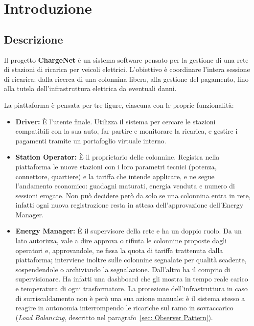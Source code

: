 \chapter{Introduzione}


\section{Descrizione}
Il progetto \textbf{ChargeNet} è un sistema software pensato per la gestione di una rete di stazioni di ricarica per veicoli elettrici. L'obiettivo è coordinare l'intera sessione di ricarica: dalla ricerca di una colonnina libera, alla gestione del pagamento, fino alla tutela dell'infrastruttura elettrica da eventuali danni.

La piattaforma è pensata per tre figure, ciascuna con le proprie funzionalità:

\begin{itemize}
    \item \textbf{Driver:} È l'utente finale. Utilizza il sistema per cercare le stazioni compatibili con la sua auto, far partire e monitorare la ricarica, e gestire i pagamenti tramite un portafoglio virtuale interno.
    
    \item \textbf{Station Operator:} È il proprietario delle colonnine. Registra nella piattaforma le nuove stazioni con i loro parametri tecnici (potenza, connettore, quartiere) e la tariffa che intende applicare, e ne segue l'andamento economico: guadagni maturati, energia venduta e numero di sessioni erogate. Non può decidere però da solo se una colonnina entra in rete, infatti ogni nuova registrazione resta in attesa dell'approvazione dell'Energy Manager.

    \item \textbf{Energy Manager:} È il supervisore della rete e ha un doppio ruolo. Da un lato autorizza, vale a dire approva o rifiuta le colonnine proposte dagli operatori e, approvandole, ne fissa la quota di tariffa trattenuta dalla piattaforma; interviene inoltre sulle colonnine segnalate per qualità scadente, sospendendole o archiviando la segnalazione. Dall'altro ha il compito di supervisionare. Ha infatti una dashboard che gli mostra in tempo reale carico e temperatura di ogni trasformatore. La protezione dell'infrastruttura in caso di surriscaldamento non è però una sua azione manuale: è il sistema stesso a reagire in autonomia interrompendo le ricariche sul ramo in sovraccarico (\textit{Load Balancing}, descritto nel paragrafo~\ref{sec: Observer Pattern}).
\end{itemize}

